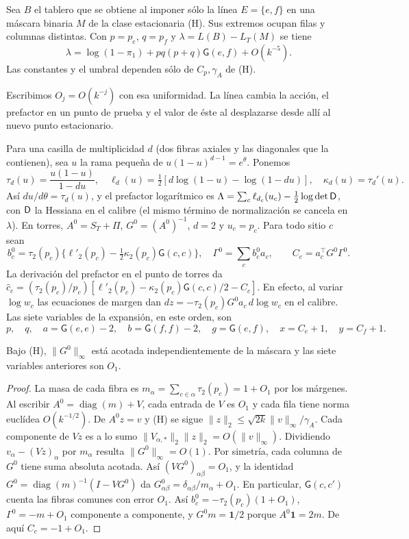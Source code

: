 \begin{proposicion}\label{prop:una-linea}
Sea $B$ el tablero que se obtiene al imponer sólo la línea $E=\{e,f\}$ en una máscara
binaria $M$ de la clase estacionaria (H). Sus extremos ocupan filas y columnas distintas.
Con $p=p_e$, $q=p_f$ y $\lambda=L(B)-L_T(M)$ se tiene
\begin{equation}\label{eq:una-linea}
 \lambda=\log(1-\pi_1)+pq(p+q)\mathsf G(e,f)+O(k^{-5}).
\end{equation}
Las constantes y el umbral dependen sólo de $C_p,\gamma_A$ de (H).
\end{proposicion}
Escribimos $O_j=O(k^{-j})$ con esa uniformidad. La línea cambia la acción,
el prefactor en un punto de prueba y el valor de éste al desplazarse desde allí
al nuevo punto estacionario.

Para una casilla de multiplicidad $d$ (dos fibras axiales y las diagonales que la contienen),
sea $u$ la rama pequeña de $u(1-u)^{d-1}=e^\theta$. Ponemos
\[
 \tau_d(u)=\frac{u(1-u)}{1-du},\quad
 \ell_d(u)=\tfrac12[d\log(1-u)-\log(1-du)],\quad \kappa_d(u)=\tau_d'(u).
\]
Así $du/d\theta=\tau_d(u)$, y el prefactor logarítmico es
$\Lambda=\sum_c\ell_{d_c}(u_c)-\tfrac12\log\det \mathsf D$, con $\mathsf D$ la Hessiana en el calibre
(el mismo término de normalización se cancela en $\lambda$).
En torres, $A^0=S_T+\Pi$, $G^0=(A^0)^{-1}$, $d=2$ y $u_c=p_c$. Para todo sitio $c$ sean
\[
 b_c^0=\tau_2(p_c)\{\ell'_2(p_c)-\tfrac12\kappa_2(p_c)\mathsf G(c,c)\},\quad
 \Gamma^0=\sum_c b_c^0a_c,\qquad C_c=a_c^\top G^0\Gamma^0 .
\]
La derivación del prefactor en el punto de torres da
$\hat c_c=(\tau_2(p_c)/p_c)
[\ell'_2(p_c)-\kappa_2(p_c)\mathsf G(c,c)/2-C_c]$.
En efecto, al variar $\log w_c$ las ecuaciones de margen dan
$dz=-\tau_2(p_c)G^0a_c\,d\log w_c$ en el calibre.
Las siete variables de la expansión, en este orden, son
\[
 p,\quad q,\quad a=\mathsf G(e,e)-2,\quad b=\mathsf G(f,f)-2,\quad
 g=\mathsf G(e,f),\quad x=C_e+1,\quad y=C_f+1 .
\]
\begin{lema}\label{lem:linea-inversa}
Bajo (H), $\|G^0\|_\infty$ está acotada independientemente de la máscara y las siete
variables anteriores son $O_1$.
\end{lema}
\begin{proof}
La masa de cada fibra es $m_\alpha=\sum_{c\in\alpha}\tau_2(p_c)=1+O_1$ por los márgenes.
Al escribir $A^0=\operatorname{diag}(m)+V$, cada entrada de $V$ es $O_1$ y cada fila
tiene norma euclídea $O(k^{-1/2})$. De $A^0z=v$ y (H) se sigue
$\|z\|_2\le\sqrt{2k}\|v\|_\infty/\gamma_A$. Cada componente de $Vz$ es a lo sumo
$\|V_{\alpha,*}\|_2\|z\|_2=O(\|v\|_\infty)$. Dividiendo $v_\alpha-(Vz)_\alpha$ por $m_\alpha$
resulta $\|G^0\|_\infty=O(1)$. Por simetría, cada columna de $G^0$ tiene suma absoluta
acotada. Así $(VG^0)_{\alpha\beta}=O_1$, y la identidad $G^0=\operatorname{diag}(m)^{-1}(I-VG^0)$ da
$G^0_{\alpha\beta}=\delta_{\alpha\beta}/m_\alpha+O_1$. En particular,
$\mathsf G(c,c')$ cuenta las fibras comunes con error $O_1$. Así
$b_c^0=-\tau_2(p_c)(1+O_1)$, $\Gamma^0=-m+O_1$ componente a componente, y
$G^0m=\symbf{1}/2$ porque $A^0\symbf{1}=2m$. De aquí $C_c=-1+O_1$.
\end{proof}

